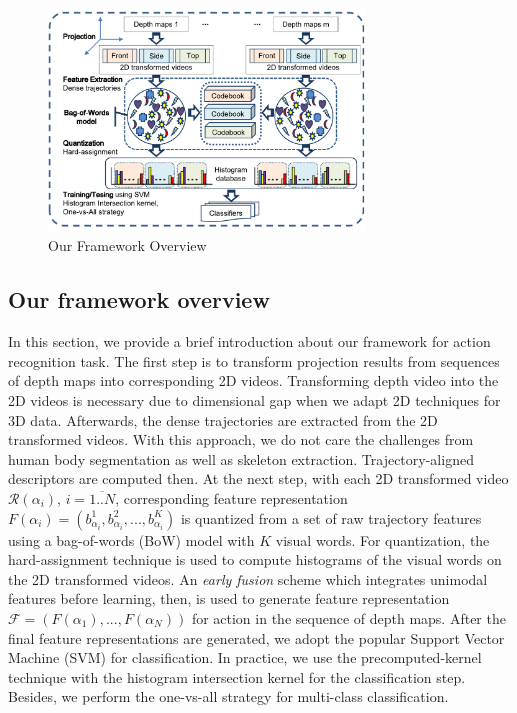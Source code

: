 \documentclass[final,3p,times,twocolumn]{elsarticle}
\begin{document}
\begin{figure}[ht]
	\centering
		\includegraphics[width=0.75\textwidth]{Framework3D.pdf} %
	\caption{\label{Figure_FrameworkOverview}Our Framework Overview}
\end{figure}

\subsection{Our framework overview}

In this section, we provide a brief introduction about our framework for action recognition task.
The first step is to transform projection results from sequences of depth maps into corresponding 2D videos.
Transforming depth video into the 2D videos is necessary due to dimensional gap when we adapt 2D techniques for 3D data.
Afterwards, the dense trajectories \cite{wang2011densetraj} are extracted from the 2D transformed videos.
With this approach, we do not care the challenges from human body segmentation as well as skeleton extraction.
Trajectory-aligned descriptors are computed then. At the next step, with each 2D transformed video $\mathcal{R}(\alpha_i)$, $i = \overline{1..N}$, corresponding feature representation $F(\alpha_i) = (b^1_\text{$\alpha_i$},b^2_\text{$\alpha_i$},...,b^K_\text{$\alpha_i$})$ is quantized from a set of raw trajectory features using a bag-of-words (BoW) model with $K$ visual words.
For quantization, the hard-assignment technique is used to compute histograms of the visual words on the 2D transformed videos.
An \textit{early fusion} scheme which integrates unimodal features before learning, then, is used to generate feature representation $\mathcal{F} = (F(\alpha_1),...,F(\alpha_N))$ for action in the sequence of depth maps.
After the final feature representations are generated, we adopt the popular Support Vector Machine (SVM) for classification. In practice, we use the precomputed-kernel technique with the histogram intersection kernel for the classification step.
Besides, we perform the one-vs-all strategy for multi-class classification.
\end{document}
